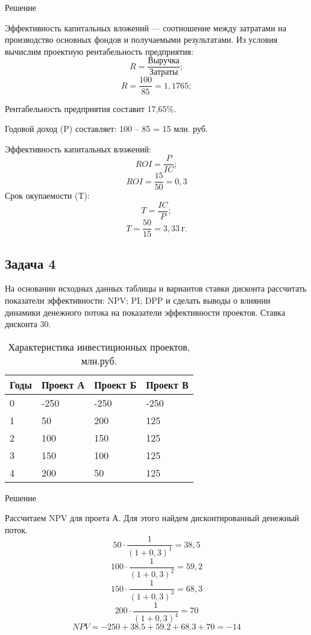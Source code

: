\begin{center}
	Решение
\end{center}

Эффективность капитальных вложений --- соотношение между затратами на производство основных фондов и получаемыми результатами. Из условия вычислим проектную рентабельность предприятия:
\[ R = \frac{\text{Выручка}}{\text{Затраты}}; \]
\[ R = \frac{\text{100}}{\text{85}} = 1,1765; \]

Рентабельность предприятия составит 17,65\%.

Годовой доход (P) составляет: 100 -- 85 = 15 млн. руб.

Эффективность капитальных вложений:
\[ROI = \frac{P}{IC} ;\]
\[ROI = \frac{15}{50} = 0,3 \]
Срок окупаемости (T):
\[ T = \frac{IC}{P}; \]
\[ T = \frac{50}{15} = 3,33\  \text{г.} \]

\subsection{Задача 4}
На основании исходных данных таблицы и вариантов ставки дисконта рассчитать  показатели эффективности: NPV; PI; DPP и сделать выводы о влиянии динамики денежного потока на показатели эффективности проектов. Ставка дисконта 30.

\begin{table}[!h]
	\small
	\caption{Характеристика инвестиционных проектов, млн.руб.}
	\label{my-label}
	\begin{tabularx}{\textwidth}{|K{3.25cm}|K{4cm}|K{4cm}|K{4cm}|}
			\hline
			Годы & Проект А & Проект Б & Проект В \\     & -250     & -250     & -250     \\     & 50       & 200      & 125      \\     & 100      & 150      & 125      \\     & 150      & 100      & 125      \\     & 200      & 50       & 125      \\ \hline
		\end{tabularx}
\end{table}

\begin{center}
	Решение
\end{center}

Рассчитаем NPV для проета А. Для этого найдем дисконтированный денежный поток.\\
\[50 \cdot \dfrac{1}{(1+0,3)^1} = 38,5\]
\[100 \cdot \dfrac{1}{(1+0,3)^2} = 59,2\]
\[150 \cdot \dfrac{1}{(1+0,3)^3} = 68,3\]
\[200 \cdot \dfrac{1}{(1+0,3)^4} = 70\]
\[NPV = -250+38.5+59.2+68.3+70=-14\]

